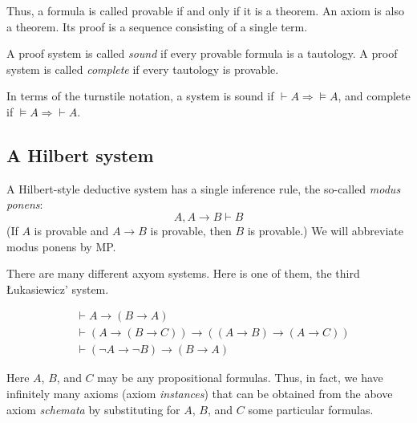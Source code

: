 \begin{page}

Thus, a formula is called provable if and only if it is a theorem.
An axiom is also a theorem.
Its proof is a sequence consisting of a single term.



\end{page}

\begin{page}

\begin{dfn}
A proof system is called \emph{sound} if every provable formula is a tautology.
A proof system is called \emph{complete} if every tautology is provable.
\end{dfn}

\end{page}

\begin{page}


In terms of the turnstile notation, a system is sound if $\vdash A \Rightarrow  \vDash A$, and complete if $\vDash A \Rightarrow \vdash A$.



\end{page}

\begin{page}

\subsection{A Hilbert system}
A Hilbert-style deductive system has a single inference rule, the so-called \emph{modus ponens}:
\[
A, A \to B \vdash B
\]
(If $A$ is provable and $A \to B$ is provable, then $B$ is provable.)
We will abbreviate modus ponens by MP.

There are many different axyom systems.
Here is one of them, the third \L{}ukasiewicz' system.

\begin{align*}
&\vdash A \to (B \to A)\\
&\vdash (A \to (B \to C)) \to ((A \to B) \to (A \to C))\\
&\vdash (\neg A \to \neg B) \to (B \to A)
\end{align*}

Here $A$, $B$, and $C$ may be any propositional formulas.
Thus, in fact, we have infinitely many axioms (axiom \emph{instances}) that can be obtained from the above axiom \emph{schemata}
by substituting for $A$, $B$, and $C$ some particular formulas.


\end{page}

